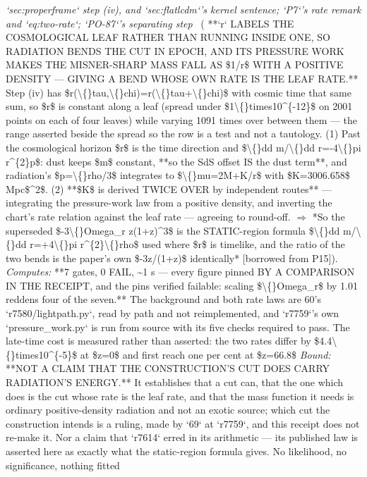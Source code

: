 \begin{description}
\textit{`sec:properframe` step (iv), and `sec:flatlcdm`'s kernel sentence; `P7`'s rate remark and `eq:two-rate`; `PO-87`'s separating step} \ ( **`r` LABELS THE COSMOLOGICAL LEAF RATHER THAN RUNNING INSIDE ONE, SO RADIATION BENDS THE CUT IN EPOCH, AND ITS PRESSURE WORK MAKES THE MISNER-SHARP MASS FALL AS \$1/r\$ WITH A POSITIVE DENSITY --- GIVING A BEND WHOSE OWN RATE IS THE LEAF RATE.** Step (iv) has \$r(\textbackslash\{\}tau,\textbackslash\{\}chi)=r(\textbackslash\{\}tau+\textbackslash\{\}chi)\$ with cosmic time that same sum, so \$r\$ is constant along a leaf (spread under \$1\textbackslash\{\}times10\textasciicircum{}\{-12\}\$ on 2001 points on each of four leaves) while varying 1091 times over between them --- the range asserted beside the spread so the row is a test and not a tautology. (1) Past the cosmological horizon \$r\$ is the time direction and \$\textbackslash\{\}dd m/\textbackslash\{\}dd r=-4\textbackslash\{\}pi r\textasciicircum{}\{2\}p\$: dust keeps \$m\$ constant, **so the SdS offset IS the dust term**, and radiation's \$p=\textbackslash\{\}rho/3\$ integrates to \$\textbackslash\{\}mu=2M+K/r\$ with \$K=3006.658\$ Mpc\$\textasciicircum{}2\$. (2) **\$K\$ is derived TWICE OVER by independent routes** --- integrating the pressure-work law from a positive density, and inverting the chart's rate relation against the leaf rate --- agreeing to round-off. \ensuremath{\Rightarrow} *So the superseded \$-3\textbackslash\{\}Omega\_r z(1+z)\textasciicircum{}3\$ is the STATIC-region formula \$\textbackslash\{\}dd m/\textbackslash\{\}dd r=+4\textbackslash\{\}pi r\textasciicircum{}\{2\}\textbackslash\{\}rho\$ used where \$r\$ is timelike, and the ratio of the two bends is the paper's own \$-3z/(1+z)\$ identically* [borrowed from P15]). 
\emph{Computes:} **7 gates, 0 FAIL, \textasciitilde{}1 s --- every figure pinned BY A COMPARISON IN THE RECEIPT, and the pins verified failable: scaling \$\textbackslash\{\}Omega\_r\$ by 1.01 reddens four of the seven.** The background and both rate laws are 60's `r7580/lightpath.py`, read by path and not reimplemented, and `r7759`'s own `pressure\_work.py` is run from source with its five checks required to pass. The late-time cost is measured rather than asserted: the two rates differ by \$4.4\textbackslash\{\}times10\textasciicircum{}\{-5\}\$ at \$z=0\$ and first reach one per cent at \$z=66.8\$
 \emph{Bound:}  **NOT A CLAIM THAT THE CONSTRUCTION'S CUT DOES CARRY RADIATION'S ENERGY.** It establishes that a cut can, that the one which does is the cut whose rate is the leaf rate, and that the mass function it needs is ordinary positive-density radiation and not an exotic source; which cut the construction intends is a ruling, made by `69` at `r7759`, and this receipt does not re-make it.  Nor a claim that `r7614` erred in its arithmetic --- its published law is asserted here as exactly what the static-region formula gives.  No likelihood, no significance, nothing fitted

\end{description}
